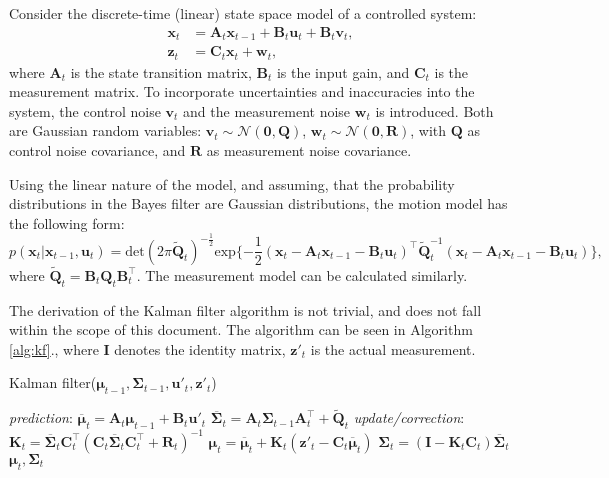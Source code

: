 Consider the discrete-time (linear) state space model of a controlled system:
\begin{align}
    \mathbf{x}_t & = \mathbf{A}_t\mathbf{x}_{t-1} + \mathbf{B}_t\mathbf{u}_t + \mathbf{B}_t\mathbf{v}_t, \\
    \mathbf{z}_t & = \mathbf{C}_t\mathbf{x}_t + \mathbf{w}_t, \label{eq:lin-meas-model}
\end{align}
where $\mathbf{A}_t$ is the state transition matrix, $\mathbf{B}_t$ is the input gain, and $\mathbf{C}_t$ is the measurement matrix. To incorporate uncertainties and inaccuracies into the system,
the control noise $\mathbf{v}_t$ and the measurement noise $\mathbf{w}_t$ is introduced.
Both are Gaussian random variables:
$\mathbf{v}_t \sim \mathcal{N}(\mathbf{0},\mathbf{Q})$, $\mathbf{w}_t \sim \mathcal{N}(\mathbf{0},\mathbf{R})$,
with $\mathbf{Q}$ as control noise covariance, and $\mathbf{R}$ as measurement noise covariance.

Using the linear nature of the model, and assuming, that the probability distributions in the Bayes filter are Gaussian distributions, the motion model has the following form:
\begin{equation}\label{key}
    p(\mathbf{x}_t|\mathbf{x}_{t-1}, \mathbf{u}_t) = \mathrm{det}(2\pi\tilde{\mathbf{Q}}_t)
    ^{-\frac{1}{2}}\mathrm{exp}\{-\frac{1}{2}(\mathbf{x}_t-\mathbf{A}_t\mathbf{x}_{t-1}-
    \mathbf{B}_t\mathbf{u}_t)^\top\tilde{\mathbf{Q}}_t^{-1}(\mathbf{x}_t-\mathbf{A}_t\mathbf{x}_{t-1}-\mathbf{B}_t\mathbf{u}_t)\},
\end{equation}
where $\tilde{\mathbf{Q}}_t = \mathbf{B}_t\mathbf{Q}_t\mathbf{B}_t^{\top}$.
The measurement model can be calculated similarly.

The derivation of the Kalman filter algorithm is not trivial, and does not fall within the scope of this document. The algorithm can be seen in Algorithm \ref{alg:kf}., where $\mathbf{I}$ denotes the identity matrix, $\mathbf{z}'_t$ is the actual measurement.

\begin{algorithm}
    \caption{Kalman filter($\boldsymbol{\mu}_{t-1},\mathbf{\Sigma}_{t-1},\mathbf{u}'_t,\mathbf{z}'_t$)}\label{alg:kf}
    \begin{algorithmic}[1]
        \BState \emph{prediction}:
        \State\indent$\overline{\boldsymbol{\mu}}_t = \mathbf{A}_t{\boldsymbol{\mu}}_{t-1} + \mathbf{B}_t\mathbf{u}'_t$
        \State\indent $\overline{\mathbf{\Sigma}}_t = \mathbf{A}_t\mathbf{\Sigma}_{t-1}\mathbf{A}^\top_t + \tilde{\mathbf{Q}}_t$
        \BState \emph{update/correction}:
        \State\indent $\mathbf{K}_t = \overline{\mathbf{\Sigma}}_t\mathbf{C}_t^\top\left(\mathbf{C}_t\overline{\mathbf{\Sigma}}_t\mathbf{C}_t^\top+\mathbf{R}_t\right)^{-1}$
        \State\indent $\boldsymbol{\mu}_t = \overline{\boldsymbol{\mu}}_t + \mathbf{K}_t\left(\mathbf{z}'_t-\mathbf{C}_t\overline{\boldsymbol{\mu}}_t\right)$
        \State\indent $\mathbf{\Sigma}_t = \left(\mathbf{I}-\mathbf{K}_t\mathbf{C}_t\right)\overline{\mathbf{\Sigma}}_t$
        \State\Return $\boldsymbol{\mu}_t,\mathbf{\Sigma}_t$
    \end{algorithmic}
\end{algorithm}
